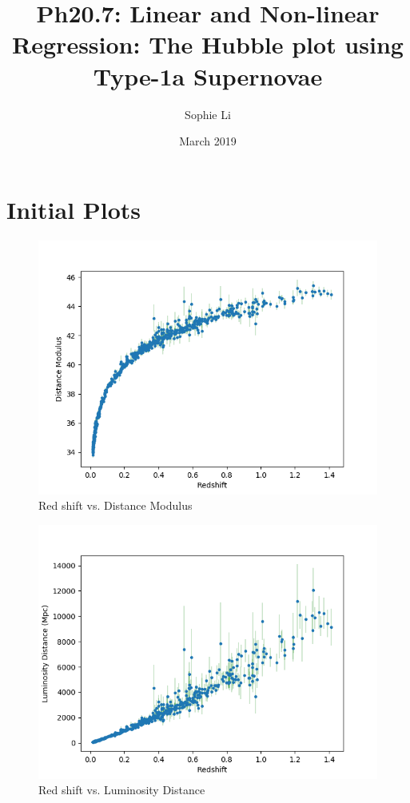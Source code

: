 \documentclass{article}
\title{Ph20.7: Linear and Non-linear Regression: The Hubble plot using Type-1a Supernovae}
\author{Sophie Li}
\date{March 2019}
\begin{document}
\maketitle
\section{Initial Plots}
\begin{figure}[H]
    \centering
    \includegraphics[width = \textwidth]{Images/redshiftdm.png}
    \caption{Red shift vs. Distance Modulus}
    \label{fig:redshiftdm}
\end{figure}

\begin{figure}[H]
    \centering
    \includegraphics[width = \textwidth]{Images/redshiftld.png}
    \caption{Red shift vs. Luminosity Distance}
    \label{fig:redshiftld}
\end{figure}
\end{document}
